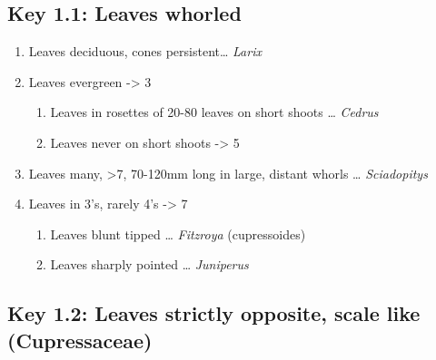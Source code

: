 \documentclass[openany]{book}
\providecommand{\tightlist}{%
  \setlength{\itemsep}{0pt}\setlength{\parskip}{0pt}}
\begin{document}
\hypertarget{key-1.1-leaves-whorled}{%
\subsection*{Key 1.1: Leaves whorled}\label{key-1.1-leaves-whorled}}

\begin{enumerate}
\def\labelenumi{\arabic{enumi}.}
\tightlist
\item
  Leaves deciduous, cones persistent\ldots{} \emph{Larix}
\item
  Leaves evergreen -\textgreater{} 3

  \begin{enumerate}
  \def\labelenumii{\arabic{enumii}.}
  \setcounter{enumii}{2}
  \tightlist
  \item
    Leaves in rosettes of 20-80 leaves on short shoots \ldots{}
    \emph{Cedrus}
  \item
    Leaves never on short shoots -\textgreater{} 5
  \end{enumerate}
\item
  Leaves many, \textgreater{}7, 70-120mm long in large, distant whorls
  \ldots{} \emph{Sciadopitys}
\item
  Leaves in 3's, rarely 4's -\textgreater{} 7

  \begin{enumerate}
  \def\labelenumii{\arabic{enumii}.}
  \setcounter{enumii}{6}
  \tightlist
  \item
    Leaves blunt tipped \ldots{} \emph{Fitzroya} (cupressoides)
  \item
    Leaves sharply pointed \ldots{} \emph{Juniperus}
  \end{enumerate}
\end{enumerate}

\hypertarget{key-1.2-leaves-strictly-opposite-scale-like-cupressaceae}{%
\subsection*{Key 1.2: Leaves strictly opposite, scale like
(Cupressaceae)}\label{key-1.2-leaves-strictly-opposite-scale-like-cupressaceae}}
\end{document}

